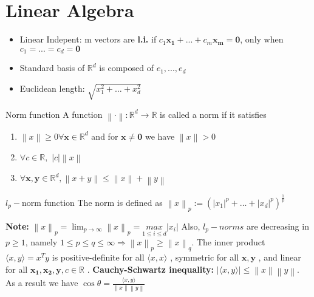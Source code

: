 \documentclass[a4paper]{article}
\begin{document}
\section{Linear Algebra}
\begin{itemize}
    \item Linear Indepent: m vectors are \textbf{l.i.} if $c_1 \mathbf{x_1} + ... + c_m\mathbf{x_m} = \mathbf{0}$, only when $c_1 = ... = c_d = \mathbf{0}$ 
    \item Standard basis of $\mathbb{R}^d$ is composed of $e_1, ..., e_d$    
    \item Euclidean length: $\sqrt{x_1^2 + \dots + x_d^2}$ 
\end{itemize}


\begin{mainbox}{Norm function}
    A function $\left\lVert \cdot \right\rVert: \mathbb{R}^d \to \mathbb{R}$ 
    is called a norm if it satisfies \begin{enumerate}
        \item $\left\lVert x\right\rVert \geq 0 \forall \mathbf{x}\in \mathbb{R}^d$ and for $\mathbf{x}\neq \mathbf{0}$ we have $\left\lVert x\right\rVert > 0$ 
        \item $\forall c \in \mathbb{R}, $ $|c|\left\lVert x\right\rVert $  
        \item $\forall \mathbf{x,y}\in \mathbb{R}^d, \left\lVert x+y\right\rVert \leq \left\lVert x\right\rVert + \left\lVert y\right\rVert $   
    \end{enumerate}
\end{mainbox}

\begin{subbox}{$l_p-$norm function}
    The norm is defined as $\left\lVert x\right\rVert_p := (|x_1|^p + \dots + |x_d|^p)^\frac{1}{p}$ 
\end{subbox}
\textbf{Note:} $\left\lVert x\right\rVert_p = \lim_{p\to \infty}\left\lVert x\right\rVert_p = \underset{1\leq i \leq d}{max} |x_i| $ 
\newline
Also, $l_p-norms$ are decreasing in $p\geq 1$, namely $1 \leq p \leq q \leq \infty \Rightarrow \left\lVert x\right\rVert_p \geq \left\lVert x\right\rVert_q$.
\newline
The inner product $\langle x,y \rangle = x^Ty$ is positive-definite for all $\langle x,x\rangle$ , symmetric for all $\mathbf{x,y}$ , and linear for all $\mathbf{x_1, x_2, y}, c\in\mathbb{R} $ . 
\newline
\textbf{Cauchy-Schwartz inequality: } $|\langle x,y\rangle| \leq \left\lVert x\right\rVert \left\lVert y\right\rVert$. As a result we have $\cos \theta = \frac{\langle x,y\rangle}{\left\lVert x\right\rVert\left\lVert y\right\rVert  }$   
\end{document}
